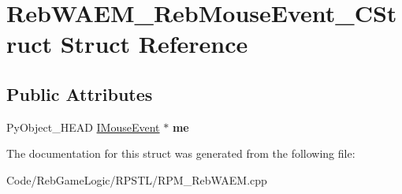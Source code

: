 \hypertarget{struct_reb_w_a_e_m___reb_mouse_event___c_struct}{}\section{Reb\+W\+A\+E\+M\+\_\+\+Reb\+Mouse\+Event\+\_\+\+C\+Struct Struct Reference}
\label{struct_reb_w_a_e_m___reb_mouse_event___c_struct}
\subsection*{Public Attributes}
\begin{DoxyCompactItemize}
\item 
Py\+Object\+\_\+\+H\+E\+AD \hyperlink{class_i_mouse_event}{I\+Mouse\+Event} $\ast$ {\bfseries me}\hypertarget{struct_reb_w_a_e_m___reb_mouse_event___c_struct_abd5f8c434280c697fb6941bb2296481a}{}\label{struct_reb_w_a_e_m___reb_mouse_event___c_struct_abd5f8c434280c697fb6941bb2296481a}

\end{DoxyCompactItemize}


The documentation for this struct was generated from the following file\+:\begin{DoxyCompactItemize}
\item 
Code/\+Reb\+Game\+Logic/\+R\+P\+S\+T\+L/R\+P\+M\+\_\+\+Reb\+W\+A\+E\+M.\+cpp\end{DoxyCompactItemize}
